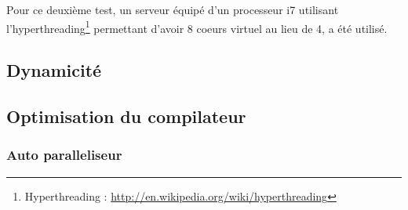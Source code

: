 Pour ce deuxième test, un serveur équipé d'un processeur i7 utilisant l'hyperthreading\footnote{Hyperthreading : \url{http://en.wikipedia.org/wiki/hyperthreading}} permettant d'avoir 8 coeurs virtuel au lieu de 4, a été utilisé.

\subsection{Dynamicité}

\subsection{Optimisation du compilateur}

\subsubsection{Auto paralleliseur}
